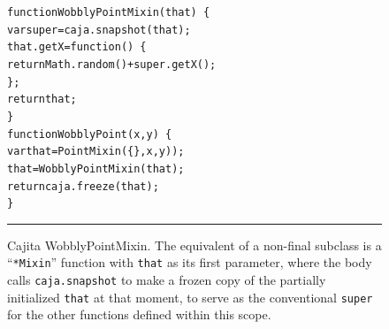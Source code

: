\documentclass[letterpaper,twocolumn,10pt]{article}
\newcommand{\code}[1]{{\tt {#1}}}              %
\begin{document}
\begin{figure}[t!]
\begin{alltt}
function WobblyPointMixin(that)\ \{
  var super = caja.snapshot(that);
  that.getX = function()\ \{ 
    return Math.random() + super.getX(); 
  \};
  return that;
\}
function WobblyPoint(x, y)\ \{
  var that = PointMixin(\{\}, x, y));
  that = WobblyPointMixin(that);
  return caja.freeze(that);
\}
\end{alltt}

\caption[Cajita WobblyPointMixin.]{Cajita WobblyPointMixin. The equivalent of 
a non-final subclass is a ``\code{*Mixin}'' function with \code{that} as its 
first parameter, where the body calls \code{caja.snapshot} to make a frozen 
copy of the partially initialized \code{that} at that moment, to serve as the 
conventional \code{super} for the other functions defined within this scope. 
\\ } \hrule
\label{fig:cajita-super-wobbly-point} 
\end{figure}
\end{document}
